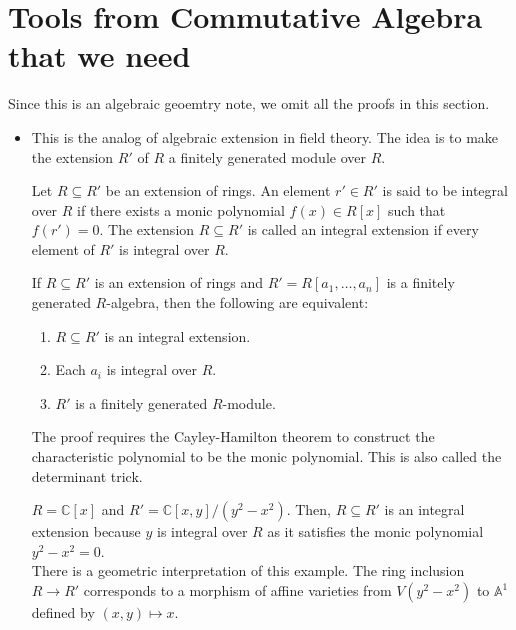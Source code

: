 \documentclass[15pt]{scrartcl}
\newcommand{\A}{\mathbb{A}}
\newcommand{\C}{\mathbb{C}}
\begin{document}
\section{Tools from Commutative Algebra that we need}
Since this is an algebraic geoemtry note, we omit all the proofs in this section. 
\begin{itemize}
    \subsection{Integral extension}
    \item This is the analog of algebraic extension in field theory. The idea is to make the extension $R'$ of $R$ a finitely generated module over $R$. 
    \begin{definition}
        Let $R\subseteq R'$ be an extension of rings. An element $r'\in R'$ is said to be integral over $R$ if there exists a monic polynomial $f(x)\in R[x]$ such that $f(r')=0$. The extension $R\subseteq R'$ is called an integral extension if every element of $R'$ is integral over $R$.
    \end{definition}
    \begin{theorem}
        If $R\subseteq R'$ is an extension of rings and $R'=R[a_1, \ldots, a_n]$ is a finitely generated $R$-algebra, then the following are equivalent:
        \begin{enumerate}
            \item $R\subseteq R'$ is an integral extension.
            \item Each $a_i$ is integral over $R$.
            \item $R'$ is a finitely generated $R$-module.
        \end{enumerate}
            The proof requires the Cayley-Hamilton theorem to construct the characteristic polynomial to be the monic polynomial. This is also called the determinant trick. 
    \end{theorem}
    \begin{example}
        $R=\C[x]$ and $R'=\C[x,y]/(y^2-x^2)$. Then, $R\subseteq R'$ is an integral extension because $y$ is integral over $R$ as it satisfies the monic polynomial $y^2-x^2=0$.
        \\

        There is a geometric interpretation of this example. The ring inclusion $R \to R'$ corresponds to a morphism of affine varieties from $V(y^2-x^2)$ to $\A^1$ defined by $(x,y)\mapsto x$. 
        

\end{example}
\end{itemize}
\end{document}
